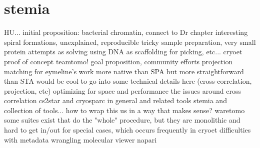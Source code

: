 \section{stemia}



\begin{outline}
\1 HU...
    \2 initial proposition: bacterial chromatin, connect to Dr chapter
    \2 interesting spiral formations, unexplained, reproducible
    \2 tricky sample preparation, very small protein
        \3 attempts as solving using DNA as scaffolding for picking, etc...
        \3 cryoet proof of concept
\1 teamtomo!
    \2 goal proposition, community efforts
\1 projection matching for eymeline's work
    \2 more native than SPA but more straightforward than STA
    \2 would be cool to go into some technical details here (cross-correlation, projection, etc)
    \2 optimizing for space and performance
    \2 the issues around cross correlation
\1 cs2star and cryosparc in general and related tools
\1 stemia and collection of tools... how to wrap this us in a way that makes sense?
\1 waretomo
    \2 some suites exist that do the "whole" procedure, but they are monolithic and hard to get in/out for special cases, which occurs frequently in cryoet
    \2 difficulties with metadata wrangling
\1 molecular viewer napari
\end{outline}
